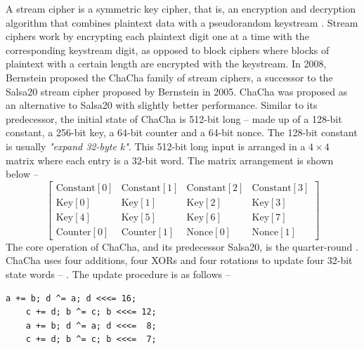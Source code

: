 \documentclass[a4paper]{cas-sc}
\begin{document}
A stream cipher is a symmetric key cipher, that is, an encryption and decryption algorithm that combines plaintext data with a pseudorandom keystream \cite{robshaw1995stream}. Stream ciphers work by encrypting each plaintext digit one at a time with the corresponding keystream digit, as opposed to block ciphers where blocks of plaintext with a certain length are encrypted with the keystream. In 2008, Bernstein proposed the ChaCha family of stream ciphers, a successor to the Salsa20 stream cipher \cite{bernstein2005salsa20} proposed by Bernstein in 2005. ChaCha was proposed as an alternative to Salsa20 \cite{bernstein2008chachaFamily} with slightly better performance. Similar to its predecessor, the initial state of ChaCha is 512-bit long -- made up of a 128-bit constant, a 256-bit key, a 64-bit counter and a 64-bit nonce. The 128-bit constant is usually \textit{"expand 32-byte k"}. This 512-bit long input is arranged in a $4\times4$ matrix where each entry is a 32-bit word. The matrix arrangement is shown below --
\begin{equation}\label{initialState}
    \left[
        \begin{array}{cccc}
            \text{Constant}[0] & \text{Constant}[1] & \text{Constant}[2] & \text{Constant}[3] \\
            \text{Key}[0]      & \text{Key}[1]      & \text{Key}[2]      & \text{Key}[3]      \\
            \text{Key}[4]      & \text{Key}[5]      & \text{Key}[6]      & \text{Key}[7]      \\
            \text{Counter}[0]  & \text{Counter}[1]  & \text{Nonce}[0]    & \text{Nonce}[1]
        \end{array}
        \right]
\end{equation}
The core operation of ChaCha, and its predecessor Salsa20, is the quarter-round . ChaCha uses four additions, four XORs and four rotations to update four 32-bit state words -- . The update procedure is as follows --
\begin{lstlisting}[basicstyle=\ttfamily,frame=none]
    a += b; d ^= a; d <<<= 16;
    c += d; b ^= c; b <<<= 12;
    a += b; d ^= a; d <<<=  8;
    c += d; b ^= c; b <<<=  7;
\end{lstlisting}
\end{document}
